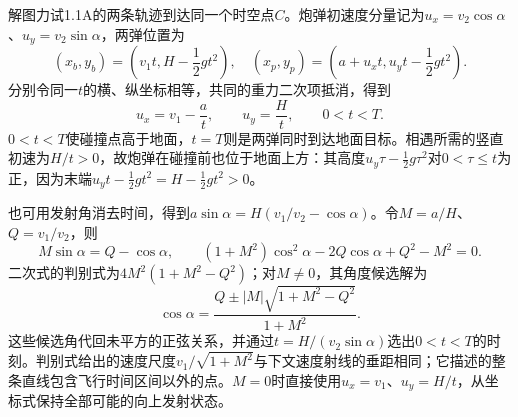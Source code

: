 \documentclass[UTF8,fontset=fandol,a4paper,11pt]{ctexart}
\begin{document}
解图力试1.1A的两条轨迹到达同一个时空点$C$。炮弹初速度分量记为$u_x=v_2\cos\alpha$、$u_y=v_2\sin\alpha$，两弹位置为
\[
(x_b,y_b)=\left(v_1t,H-\frac12gt^2\right),
\quad
(x_p,y_p)=\left(a+u_xt,u_yt-\frac12gt^2\right).
\]
分别令同一$t$的横、纵坐标相等，共同的重力二次项抵消，得到
\[
u_x=v_1-\frac at,\qquad u_y=\frac Ht,\qquad 0<t<T.
\]
$0<t<T$使碰撞点高于地面，$t=T$则是两弹同时到达地面目标。相遇所需的竖直初速为$H/t>0$，故炮弹在碰撞前也位于地面上方：其高度$u_y\tau-\frac12g\tau^2$对$0<\tau\le t$为正，因为末端$u_yt-\frac12gt^2=H-\frac12gt^2>0$。

也可用发射角消去时间，得到$a\sin\alpha=H(v_1/v_2-\cos\alpha)$。令$M=a/H$、$Q=v_1/v_2$，则
\[
 M\sin\alpha=Q-\cos\alpha,\qquad
 (1+M^2)\cos^2\alpha-2Q\cos\alpha+Q^2-M^2=0.
\]
二次式的判别式为$4M^2(1+M^2-Q^2)$；对$M\ne0$，其角度候选解为
\[
 \cos\alpha=\frac{Q\pm |M|\sqrt{1+M^2-Q^2}}{1+M^2}.
\]
这些候选角代回未平方的正弦关系，并通过$t=H/(v_2\sin\alpha)$选出$0<t<T$的时刻。判别式给出的速度尺度$v_1/\sqrt{1+M^2}$与下文速度射线的垂距相同；它描述的整条直线包含飞行时间区间以外的点。$M=0$时直接使用$u_x=v_1$、$u_y=H/t$，从坐标式保持全部可能的向上发射状态。
\end{document}

